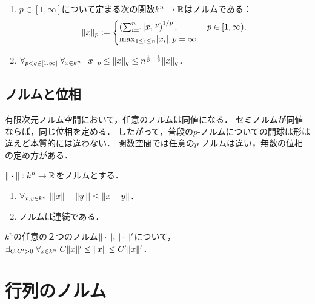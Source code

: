 \documentclass[uplatex, dvipdfmx]{jsreport}
\begin{document}
\begin{proposition}[p-norm]\mbox{}
    \begin{enumerate}
        \item 
    $p\in[1,\infty]$について定まる次の関数$k^n\to\mathbb{R}$はノルムである：
    \[
        \|x\|_p:=\begin{cases}
            \left(\sum^n_{i=1}\lvert x_i\rvert^p\right)^{1/p},&p\in[1,\infty),\\
            \max_{1\le i\le n}\lvert x_i\rvert,p=\infty.
        \end{cases}
    \]
    \item $\forall_{p<q\in[1,\infty]}\;\forall_{x\in k^n}\;\|x\|_p\le\|x\|_q\le n^{\frac{1}{p}-\frac{1}{q}}\|x\|_q$．
    \end{enumerate}
\end{proposition}

\subsection{ノルムと位相}

\begin{tcolorbox}[colframe=ForestGreen, colback=ForestGreen!10!white,breakable,colbacktitle=ForestGreen!40!white,coltitle=black,fonttitle=\bfseries\sffamily,
title=]
    有限次元ノルム空間において，任意のノルムは同値になる．
    セミノルムが同値ならば，同じ位相を定める．
    したがって，普段の$p$-ノルムについての開球は形は違えど本質的には違わない．
    関数空間では任意の$p$-ノルムは違い，無数の位相の定め方がある．
\end{tcolorbox}

\begin{proposition}
    $\|\cdot\|:k^n\to\mathbb{R}$をノルムとする．
    \begin{enumerate}
        \item $\forall_{x,y\in k^n}\;\lvert\|x\|-\|y\|\rvert\le\|x-y\|$．
        \item ノルムは連続である．
    \end{enumerate}
\end{proposition}

\begin{proposition}
    $k^n$の任意の２つのノルム$\|\cdot\|,\|\cdot\|'$について，
    $\exists_{C,C'>0}\;\forall_{x\in k^n}\; C\|x\|'\le\|x\|\le C'\|x\|'$．
\end{proposition}

\section{行列のノルム}
\end{document}
